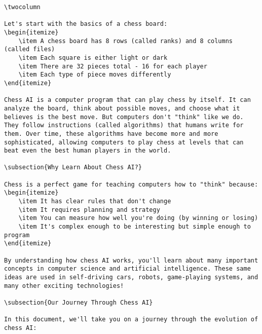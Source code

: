 \documentclass[11pt]{article}
\begin{document}
\begin{lstlisting}[style=Python]
\twocolumn

Let's start with the basics of a chess board:
\begin{itemize}
    \item A chess board has 8 rows (called ranks) and 8 columns (called files)
    \item Each square is either light or dark
    \item There are 32 pieces total - 16 for each player
    \item Each type of piece moves differently
\end{itemize}

Chess AI is a computer program that can play chess by itself. It can analyze the board, think about possible moves, and choose what it believes is the best move. But computers don't "think" like we do. They follow instructions (called algorithms) that humans write for them. Over time, these algorithms have become more and more sophisticated, allowing computers to play chess at levels that can beat even the best human players in the world.

\subsection{Why Learn About Chess AI?}

Chess is a perfect game for teaching computers how to "think" because:
\begin{itemize}
    \item It has clear rules that don't change
    \item It requires planning and strategy
    \item You can measure how well you're doing (by winning or losing)
    \item It's complex enough to be interesting but simple enough to program
\end{itemize}

By understanding how chess AI works, you'll learn about many important concepts in computer science and artificial intelligence. These same ideas are used in self-driving cars, robots, game-playing systems, and many other exciting technologies!

\subsection{Our Journey Through Chess AI}

In this document, we'll take you on a journey through the evolution of chess AI:


\end{lstlisting}
\end{document}
